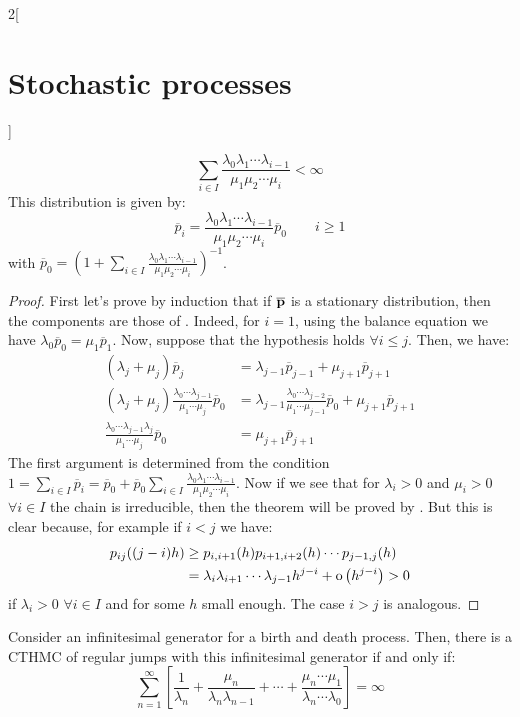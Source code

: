 \documentclass[../../../main_math.tex]{subfiles}
\begin{document}
\begin{multicols}{2}[\section{Stochastic processes}]
\begin{theorem}
    $$
      \sum_{i\in I}\frac{\lambda_0\lambda_1\cdots\lambda_{i-1}}{\mu_1\mu_2\cdots\mu_i}<\infty
    $$
    This distribution is given by:
    \begin{equation}\label{SP:limit_distribution_birth_death}
      \overline{p}_i=\frac{\lambda_0\lambda_1\cdots\lambda_{i-1}}{\mu_1\mu_2\cdots\mu_i}\overline{p}_0 \qquad i\geq 1
    \end{equation}
    with $\overline{p}_0=\left(1+\sum_{i\in I}\frac{\lambda_0\lambda_1\cdots\lambda_{i-1}}{\mu_1\mu_2\cdots\mu_i}\right)^{-1}$.
  \end{theorem}
  \begin{proof}
    First let's prove by induction that if $\boldsymbol{\mathrm{\overline{p}}}$ is a stationary distribution, then the components are those of . Indeed, for $i=1$, using the balance equation we have $\lambda_0 \overline{p}_0=\mu_1\overline{p}_1$. Now, suppose that the hypothesis holds $\forall i\leq j$. Then, we have:
    \begin{align*}
      (\lambda_j+\mu_j) \overline{p}_j                                                      & = \lambda_{j-1}\overline{p}_{j-1}+\mu_{j+1}\overline{p}_{j+1}                                                      \\
      (\lambda_j+\mu_j) \frac{\lambda_0\cdots\lambda_{j-1}}{\mu_1\cdots\mu_j}\overline{p}_0 & = \lambda_{j-1}\frac{\lambda_0\cdots\lambda_{j-2}}{\mu_1\cdots\mu_{j-1}}\overline{p}_0+\mu_{j+1}\overline{p}_{j+1} \\
      \frac{\lambda_0\cdots\lambda_{j-1}\lambda_j}{\mu_1\cdots\mu_j}\overline{p}_0          & = \mu_{j+1}\overline{p}_{j+1}
    \end{align*}
    The first argument is determined from the condition $1=\sum_{i\in I} \overline{p}_i=\overline{p}_0+\overline{p}_0\sum_{i\in I}\frac{\lambda_0\lambda_1\cdots\lambda_{i-1}}{\mu_1\mu_2\cdots\mu_i}$. Now if we see that for $\lambda_i>0$ and $\mu_i>0$ $\forall i\in I$ the chain is irreducible, then the theorem will be proved by . But this is clear because, for example if $i <j$ we have:
    \begin{align*}
      p_{ij}((j-i)h) & \geq p_{i,i+1}(h)p_{i+1,i+2}(h)\cdots p_{j-1,j}(h)              \\
                     & =\lambda_i\lambda_{i+1}\cdots\lambda_{j-1}h^{j-i}+\mathrm{o}\left(h^{j-i}\right)>0
    \end{align*}
    if $\lambda_i>0$ $\forall i\in I$ and for some $h$ small enough. The case $i>j$ is analogous.
  \end{proof}
  \begin{theorem}
    Consider an infinitesimal generator for a birth and death process. Then,  there is a CTHMC of regular jumps with this infinitesimal generator if and only if:
    $$
      \sum_{n=1}^\infty \left[\frac{1}{\lambda_n}+\frac{\mu_n}{\lambda_n\lambda_{n-1}}+ \cdots+ \frac{\mu_n\cdots \mu_1}{\lambda_n\cdots\lambda_0}\right]=\infty
    $$
  \end{theorem}

\end{multicols}
\end{document}
